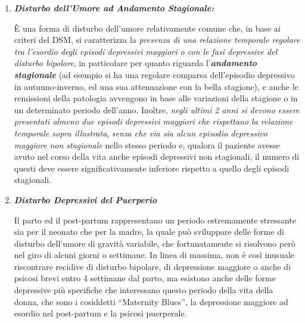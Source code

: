 \documentclass[]{article}
\begin{document}
\begin{enumerate}
\def\labelenumi{\arabic{enumi}.}
\item
  \textbf{\emph{Disturbo dell'Umore ad Andamento Stagionale:}}

  È una forma di disturbo dell'umore relativamente comune che, in base
  ai criteri del DSM, si caratterizza la \emph{presenza di una relazione
  temporale regolare tra l'esordio degli episodi depressivi maggiori o
  con le fasi depressive del disturbo bipolare}, in particolare per
  quanto riguarda l'\textbf{\emph{andamento stagionale}} (ad esempio si
  ha una regolare comparsa dell'episodio depressivo in autunno-inverno,
  ed una sua attenuazione con la bella stagione), e anche le remissioni
  della patologia avvengono in base alle variazioni della stagione o in
  un determinato periodo dell'anno. Inoltre, \emph{negli ultimi 2 anni
  si devono essere presentati almeno due episodi depressivi maggiori che
  rispettano la relazione temporale sopra illustrata}, \emph{senza che
  via sia alcun episodio depressivo maggiore non stagionale} nello
  stesso periodo e, qualora il paziente avesse avuto nel corso della
  vita anche episodi depressivi non stagionali, il numero di questi deve
  essere significativamente inferiore rispetto a quello degli episodi
  stagionali.
\item
  \textbf{\emph{Disturbo Depressivi del Puerperio}}

  Il parto ed il post-partum rappresentano un periodo estremamente
  stressante sia per il neonato che per la madre, la quale può
  sviluppare delle forme di disturbo dell'umore di gravità variabile,
  che fortunatamente si risolvono però nel giro di alcuni giorni o
  settimane. In linea di massima, non è così inusuale riscontrare
  recidive di disturbo bipolare, di depressione maggiore o anche di
  psicosi brevi entro 4 settimane dal parto, ma esistono anche delle
  forme depressive più specifiche che interessano questo periodo della
  vita della donna, che sono i cosiddetti ``Maternity Blues'', la
  depressione maggiore ad esordio nel post-partum e la psicosi
  puerperale.
\end{enumerate}
\end{document}
